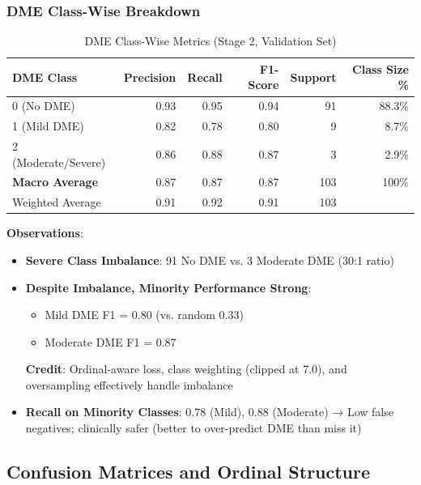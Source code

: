 \documentclass[12pt,a4paper]{article}
\begin{document}
\subsubsection{DME Class-Wise Breakdown}

\begin{table}[H]
\centering
\small
\caption{DME Class-Wise Metrics (Stage 2, Validation Set)}
\begin{tabular}{|l|r|r|r|r|r|}
\hline
\textbf{DME Class} & \textbf{Precision} & \textbf{Recall} & \textbf{F1-Score} & \textbf{Support} & \textbf{Class Size \%} \\
\hline
0 (No DME) & 0.93 & 0.95 & 0.94 & 91 & 88.3\% \\
1 (Mild DME) & 0.82 & 0.78 & 0.80 & 9 & 8.7\% \\
2 (Moderate/Severe) & 0.86 & 0.88 & 0.87 & 3 & 2.9\% \\
\hline
\textbf{Macro Average} & 0.87 & 0.87 & 0.87 & 103 & 100\% \\
Weighted Average & 0.91 & 0.92 & 0.91 & 103 & \\
\hline
\end{tabular}
\end{table}

\textbf{Observations}:

\begin{itemize}
    \item \textbf{Severe Class Imbalance}: 91 No DME vs. 3 Moderate DME (30:1 ratio)
    
    \item \textbf{Despite Imbalance, Minority Performance Strong}:
    \begin{itemize}
        \item Mild DME F1 = 0.80 (vs. random 0.33)
        \item Moderate DME F1 = 0.87
    \end{itemize}
    
    \textbf{Credit}: Ordinal-aware loss, class weighting (clipped at 7.0), and oversampling effectively handle imbalance
    
    \item \textbf{Recall on Minority Classes}: 0.78 (Mild), 0.88 (Moderate) → Low false negatives; clinically safer (better to over-predict DME than miss it)
\end{itemize}

\subsection{Confusion Matrices and Ordinal Structure}
\end{document}
